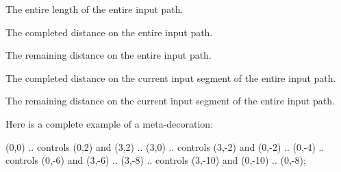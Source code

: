 \begin{command}{\pgfdeclaremetadecorate{}}
\begin{command}{\state{}}
        \begin{command}{\pgfmetadecoratedpathlength}
            The entire length of the entire input path.
        \end{command}

        \begin{command}{\pgfmetadecoratedcompleteddistance}
            The completed distance on the entire input path.
        \end{command}

        \begin{command}{\pgfmetadecoratedremainingdistance}
            The remaining distance on the entire input path.
        \end{command}

        \begin{command}{\pgfmetadecoratedinputsegmentcompleteddistance}
            The completed distance on the current input segment of the entire
            input path.
        \end{command}

        \begin{command}{\pgfmetadecoratedinputsegmentremainingdistance}
            The remaining distance on the current input segment of the entire
            input path.
        \end{command}
    \end{command}

    Here is a complete example of a meta-decoration:
\begin{codeexample}[preamble={\usetikzlibrary{decorations,decorations.pathmorphing}}]

\tikz\draw[decorate,decoration={arrows,meta-segment length=2cm}]
  (0,0) .. controls (0,2)   and (3,2)   .. (3,0)
        .. controls (3,-2)  and (0,-2)  .. (0,-4)
        .. controls (0,-6)  and (3,-6)  .. (3,-8)
        .. controls (3,-10) and (0,-10) .. (0,-8);
\end{codeexample}
\end{command}



